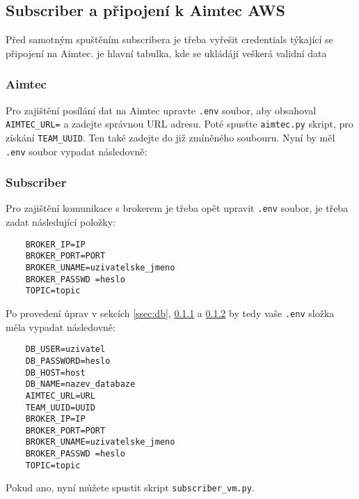\subsection{Subscriber a připojení k Aimtec AWS}
Před samotným spuštěním subscribera je třeba vyřešit credentials týkající se připojení na Aimtec. je hlavní tabulka, kde se ukládájí veškerá validní data
\subsubsection{Aimtec}
\label{sssec:aimtec}
Pro zajištění posílání dat na Aimtec upravte \verb|.env| soubor, aby obsahoval \verb|AIMTEC_URL=| a zadejte správnou URL adresu. Poté spusťte \verb|aimtec.py| skript, pro získání \verb|TEAM_UUID|. Ten také zadejte do již zmíněného soubouru.
Nyní by měl \verb|.env| soubor vypadat následovně:

\subsubsection{Subscriber}
\label{sssec:subscriber}
Pro zajištění komunikace s brokerem je třeba opět upravit \verb|.env| soubor, je třeba zadat následující položky:
\begin{verbatim}
    BROKER_IP=IP
    BROKER_PORT=PORT  
    BROKER_UNAME=uzivatelske_jmeno
    BROKER_PASSWD =heslo
    TOPIC=topic
\end{verbatim}
Po provedení úprav v sekcích \ref{ssec:db}, \ref{sssec:aimtec} a \ref{sssec:subscriber} by tedy vaše \verb|.env| složka měla vypadat následovně: 

\begin{verbatim}
    DB_USER=uzivatel
    DB_PASSWORD=heslo
    DB_HOST=host
    DB_NAME=nazev_databaze
    AIMTEC_URL=URL
    TEAM_UUID=UUID
    BROKER_IP=IP
    BROKER_PORT=PORT  
    BROKER_UNAME=uzivatelske_jmeno
    BROKER_PASSWD =heslo
    TOPIC=topic
\end{verbatim}
Pokud ano, nyní můžete spustit skript \verb|subscriber_vm.py|. %